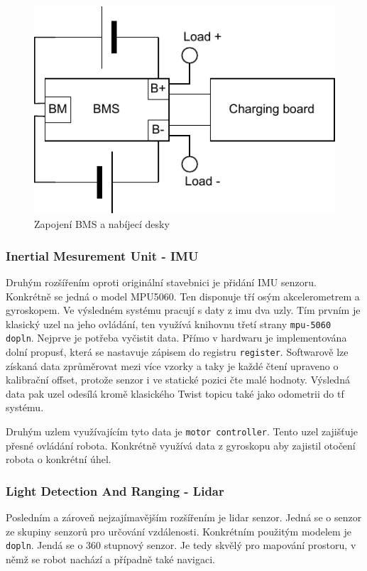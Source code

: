 \begin{figure}[h!]
	\centering
	\includegraphics[scale=0.75]{obrazky-figures/battery_circuite.pdf}
	\caption{Zapojení BMS a nabíjecí desky}
	\label{}
\end{figure}

\subsubsection*{Inertial Mesurement Unit - IMU}
Druhým rozšířením oproti originální stavebnici je přidání IMU senzoru. Konkrétně se jedná o model MPU5060. Ten disponuje tří osým akcelerometrem a gyroskopem. Ve výsledném systému pracují s daty z imu dva uzly. Tím prvním je klasický uzel na jeho ovládání, ten využívá knihovnu třetí strany \verb|mpu-5060 dopln|. Nejprve je potřeba vyčistit data. Přímo v hardwaru je implementována dolní propusť, která se nastavuje zápisem do registru \verb|register|. Softwarově lze získaná data zprůměrovat mezi více vzorky a taky je každé čtení upraveno o kalibrační offset, protože senzor i ve statické pozici čte malé hodnoty. Výsledná data pak uzel odesílá kromě klasického Twist topicu také jako odometrii do tf systému.

Druhým uzlem využívajícím tyto data je \verb|motor controller|. Tento uzel zajišťuje přesné ovládání robota. Konkrétně využívá data z gyroskopu aby zajistil otočení robota o konkrétní úhel.

\subsubsection*{Light Detection And Ranging - Lidar}
Posledním a zároveň nejzajímavějším rozšířením je lidar senzor. Jedná se o senzor ze skupiny senzorů pro určování vzdálenosti. Konkrétním použitým modelem je \verb|dopln|. Jendá se o 360 stupnový senzor. Je tedy skvělý pro mapování prostoru, v němž se robot nachází a případně také navigaci.

